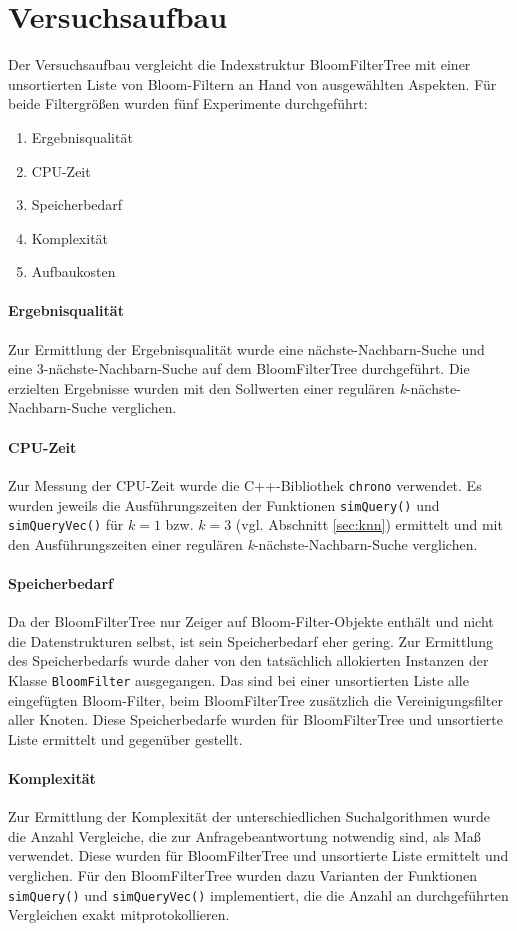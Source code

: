 \section{Versuchsaufbau}\label{sec:versuchsaufbau}
Der Versuchsaufbau vergleicht die Indexstruktur BloomFilterTree mit einer unsortierten Liste von Bloom-Filtern an Hand von ausgewählten Aspekten. Für beide Filtergrößen wurden fünf Experimente durchgeführt:  
\begin{enumerate}
	\item Ergebnisqualität
	\item CPU-Zeit 
	\item Speicherbedarf 
	\item Komplexität 
	\item Aufbaukosten 
\end{enumerate}
\paragraph*{Ergebnisqualität}
Zur Ermittlung der Ergebnisqualität wurde eine nächste-Nachbarn-Suche und eine 3-nächste-Nachbarn-Suche auf dem BloomFilterTree durchgeführt. Die erzielten Ergebnisse wurden mit den Sollwerten einer regulären \textit{k}-nächste-Nachbarn-Suche verglichen. 
\paragraph*{CPU-Zeit}
Zur Messung der CPU-Zeit wurde die C++-Bibliothek \texttt{chrono} verwendet. Es wurden jeweils die Ausführungszeiten der Funktionen \texttt{simQuery()} und \texttt{simQueryVec()} für $k=1$ bzw. $k=3$ (vgl. Abschnitt \ref{sec:knn}) ermittelt und mit den Ausführungszeiten einer regulären \textit{k}-nächste-Nachbarn-Suche verglichen.
\paragraph*{Speicherbedarf} 
Da der BloomFilterTree nur Zeiger auf Bloom-Filter-Objekte enthält und nicht die Datenstrukturen selbst, ist sein Speicherbedarf eher gering. %
Zur Ermittlung des Speicherbedarfs wurde daher von den tatsächlich allokierten Instanzen der Klasse \texttt{BloomFilter} ausgegangen. Das sind bei einer unsortierten Liste alle eingefügten Bloom-Filter, beim BloomFilterTree zusätzlich die Vereinigungsfilter aller Knoten. Diese Speicherbedarfe wurden für BloomFilterTree und unsortierte Liste ermittelt und gegenüber gestellt. 
\paragraph*{Komplexität}
Zur Ermittlung der Komplexität der unterschiedlichen Suchalgorithmen wurde die Anzahl Vergleiche, die zur Anfragebeantwortung notwendig sind, als Maß verwendet. Diese wurden für BloomFilterTree und unsortierte Liste ermittelt und verglichen. Für den BloomFilterTree wurden dazu Varianten der Funktionen \texttt{simQuery()} und \texttt{simQueryVec()} implementiert, die die Anzahl an durchgeführten Vergleichen exakt mitprotokollieren.   

